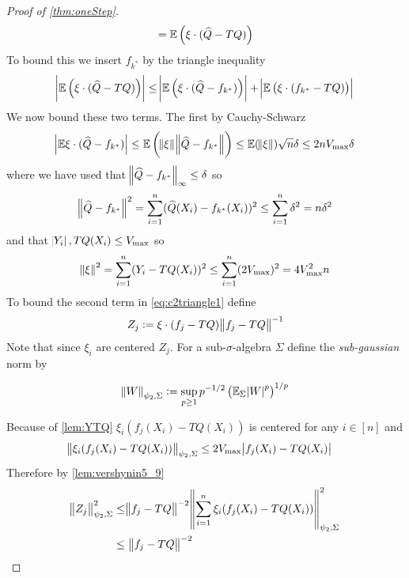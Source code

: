 \begin{proof}[Proof of \cref{thm:oneStep}]
\begin{equation}
    = \mathbb{E} \left( \xi \cdot (\widehat{Q} - TQ) \right)
  \end{equation}
  To bound this we insert $f_{k^*}$ by the triangle inequality
  \begin{equation}
    \abs{\mathbb{E} \left( \xi \cdot (\widehat{Q} - TQ) \right) }
    \leq \abs{\mathbb{E} \left( \xi \cdot (\widehat{Q} - f_{k^*}) \right) } 
    + \abs{\mathbb{E} \left( \xi \cdot (f_{k^*} - TQ) \right) }
    \label{eq:c2triangle1}
  \end{equation}
  We now bound these two terms. The first by Cauchy-Schwarz
  \begin{equation}
    \abs{\mathbb{E} \xi \cdot (\widehat{Q} - f_{k^*})}
    \leq \mathbb{E} \left( \norm{\xi} \norm{\widehat{Q} - f_{k^*}} \right)
    \leq \mathbb{E} (\norm{\xi}) \sqrt{n} \delta
    \leq 2 n V_{\max} \delta
    \label{eq:c2firstcs}
  \end{equation}
  where we have used that $\norm{\widehat{Q} - f_{k^*}}_\infty \leq \delta$ so
  \begin{equation}
    \norm{\widehat{Q} - f_{k^*}}^2
    = \sum_{i=1}^n (\widehat{Q}(X_i) - f_{k^*}(X_i))^2
    \leq \sum_{i=1}^n \delta^2
    = n \delta^2
  \end{equation}
  and that $\abs{Y_i}, TQ(X_i) \leq V_{\max}$ so
  \begin{equation}
    \norm{\xi}^2 = \sum_{i=1}^n (Y_i - TQ(X_i))^2 
    \leq \sum_{i=1}^n (2 V_{\max})^2
    = 4 V_{\max}^2 n
  \end{equation}
  To bound the second term in \cref{eq:c2triangle1} define
  \begin{equation}
  Z_j := \xi \cdot (f_j - TQ) \norm{f_j - TQ}^{-1}
  \end{equation}
  Note that since $\xi_i$ are centered $Z_j$.
  For a sub-$\sigma$-algebra $\Sigma$ define the \emph{sub-gaussian} norm by
  \begin{defn}
    \[ \norm{W}_{\psi_2,\Sigma} \vcentcolon=
    \sup_{p\geq 1} p^{-1/2} \left( \mathbb{E}_{\Sigma} \abs{W}^p \right)^{1/p} \]
  \end{defn}
  Because of \cref{lem:YTQ} $\xi_i (f_j(X_i) - TQ(X_i))$ is centered for any
  $i \in [n]$ and
  \begin{align}
    \norm{\xi_i(f_j(X_i) - TQ(X_i))}_{\psi_2, \Sigma}
    \leq &\; 2 V_{\max} \abs{f_j(X_i) - TQ(X_i)}
  \end{align}
  Therefore by \cref{lem:vershynin5_9}
  \begin{align}
    \norm{Z_j}_{\psi_2, \Sigma}^2
    \leq & \norm{f_j - TQ}^{-2}
    \norm{\sum_{i=1}^n \xi_i (f_j(X_i) - TQ(X_i))}_{\psi_2, \Sigma}^2
    \\ \leq &\; \norm{f_j - TQ}^{-2}

\end{align}
\end{proof}
